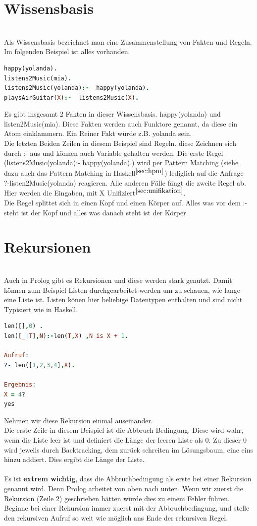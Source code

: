 \section{Wissensbasis}\qquad\\
Als Wissensbasis bezeichnet man eine Zusammenstellung von Fakten und Regeln. Im folgenden Beispiel ist alles vorhanden. 
\begin{lstlisting}[language=Prolog] 
happy(yolanda).
listens2Music(mia).
listens2Music(yolanda):-  happy(yolanda).
playsAirGuitar(X):-  listens2Music(X). 
\end{lstlisting}
Es gibt insgesamt 2 Fakten in dieser Wissensbasis. happy(yolanda) und listen2Music(mia). Diese Fakten werden auch Funktore genannt, da diese ein Atom einklammern. Ein Reiner Fakt würde z.B. yolanda sein. \\
Die letzten Beiden Zeilen in diesem Beispiel sind Regeln. diese Zeichnen sich durch :- aus und können auch Variable gehalten werden. Die erste Regel (listens2Music(yolanda):-  happy(yolanda).) wird per Pattern Matching (siehe dazu auch das Pattern Matching in Haskell$^{\ref{sec:hpm}}$) lediglich auf die Anfrage\\ ?-listen2Music(yolanda) reagieren. Alle anderen Fälle fängt die zweite Regel ab. Hier werden die Eingaben, mit X Unifiziert$^{\ref{sec:unifikation}}$. \\
Die Regel splittet sich in einen Kopf und einen Körper auf. Alles was vor dem :- steht ist der Kopf und alles was danach steht ist der Körper. 
\section{Rekursionen}\qquad\\
Auch in Prolog gibt es Rekursionen und diese werden stark genutzt. Damit können zum Beispiel Listen durchgearbeitet werden um zu schauen, wie lange eine Liste ist. Listen könen hier beliebige Datentypen enthalten und sind nicht Typisiert wie in Haskell. 
\begin{lstlisting}[language=Prolog] 
len([],0) .
len([_|T],N):-len(T,X) ,N is X + 1.

Aufruf:
?- len([1,2,3,4],X).

Ergebnis:
X = 4?
yes
\end{lstlisting}
Nehmen wir diese Rekursion einmal auseinander.\\
Die erste Zeile in diesem Beispiel ist die Abbruch Bedingung. Diese wird wahr, wenn die Liste leer ist und definiert die Länge der leeren Liste als 0. Zu dieser 0 wird jeweils durch Backtracking, dem zurück schreiten im Lösungsbaum, eine eins hinzu addiert. Dies ergibt die Länge der Liste. \\
\qquad\\
Es ist \textbf{extrem wichtig}, dass die Abbruchbedingung als erste bei einer Rekursion genannt wird. Denn Prolog arbeitet von oben nach unten. Wenn wir zuerst die Rekursion (Zeile 2) geschrieben hätten würde dies zu einem Fehler führen. \\
Beginne bei einer Rekursion immer zuerst mit der Abbruchbedingung, und stelle den rekursiven Aufruf so weit wie möglich ans Ende der rekursiven Regel.
